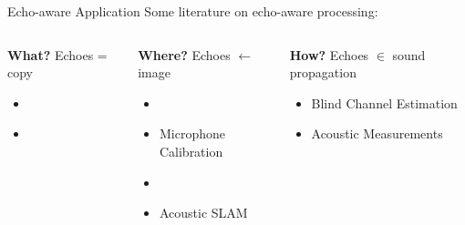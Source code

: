 \begin{frame}[t]{Echo-aware Application \hfill\faBook}
    Some literature on echo-aware processing:
    \begin{columns}[T,onlytextwidth]
        \begin{block}{\textbf{What?}}
            Echoes = copy
            \begin{itemize}
                \item {}
                \\{\footnotesize\cite{leglaive2016multichannel}}
                \item {}
                \\{\footnotesize\cite{flanagan1993spatially,dokmanic2015raking,kowalczyk2020raking}}
            \end{itemize}
        \end{block}
        \begin{block}{\textbf{Where?}}
            \small
            Echoes $\gets$ image
            \begin{itemize}
                \item {}
                \\{\footnotesize\cite{ribeiro2010turning,jensen2019method}}
                \item Microphone Calibration
                \\{\footnotesize\cite{dokmanic2015raking,salvati2016sound}}
                \item {}
                \\{\footnotesize\cite{antonacci2012inferences,crocco2017uncalibrated}}
                \item Acoustic SLAM
                \\{\footnotesize\cite{evers2018acoustic,krekovic2016echoslam}}
            \end{itemize}
        \end{block}
        \begin{block}{\textbf{How?}}
            \small
            Echoes $\in$ sound propagation
            \begin{itemize}
                \item Blind Channel Estimation
                \\{\footnotesize\cite{lin2007blind,crocco2017uncalibrated}}
                \item Acoustic Measurements
                \\{\footnotesize\cite{eaton2015ace,kuttruff2016room}}
            \end{itemize}
        \end{block}
    \end{columns}



\end{frame}
